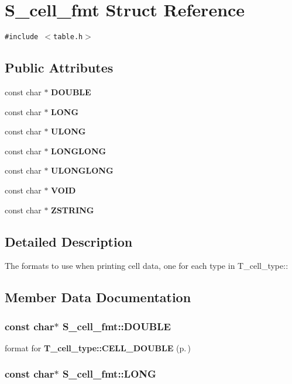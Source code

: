 \section{S\_\-cell\_\-fmt Struct Reference}
\label{structS__cell__fmt}
{\tt \#include $<$table.h$>$}

\subsection*{Public Attributes}
\begin{CompactItemize}
\item 
const char $\ast$ {\bf DOUBLE}
\item 
const char $\ast$ {\bf LONG}
\item 
const char $\ast$ {\bf ULONG}
\item 
const char $\ast$ {\bf LONGLONG}
\item 
const char $\ast$ {\bf ULONGLONG}
\item 
const char $\ast$ {\bf VOID}
\item 
const char $\ast$ {\bf ZSTRING}
\end{CompactItemize}


\subsection{Detailed Description}
The formats to use when printing cell data, one for each type in T\_\-cell\_\-type:: 



\subsection{Member Data Documentation}
\subsubsection{\setlength{\rightskip}{0pt plus 5cm}const char$\ast$ S\_\-cell\_\-fmt::DOUBLE}\label{structS__cell__fmt_m0}


format for {\bf T\_\-cell\_\-type::CELL\_\-DOUBLE} {\rm (p.\,\pageref{table_8h_a37a15})} 
\subsubsection{\setlength{\rightskip}{0pt plus 5cm}const char$\ast$ S\_\-cell\_\-fmt::LONG}\label{structS__cell__fmt_m1}


